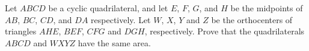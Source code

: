 Let $ABCD$ be a cyclic quadrilateral, and let $E$, $F$, $G$, and $H$ be the midpoints of $AB$, $BC$, $CD$, and $DA$ respectively. Let $W$, $X$, $Y$ and $Z$ be the orthocenters of triangles $AHE$, $BEF$, $CFG$ and $DGH$, respectively. Prove that the quadrilaterals $ABCD$ and $WXYZ$ have the same area.
